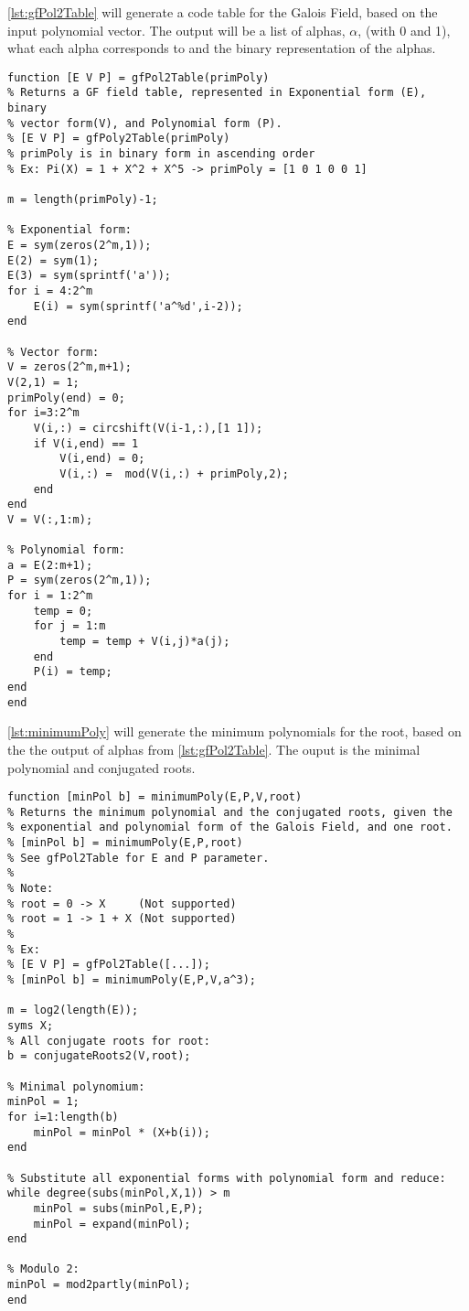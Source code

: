 \documentclass[Main]{subfiles}
\begin{document}
\codeTitle \ref{lst:gfPol2Table} will generate a code table for the Galois Field, based on the input polynomial vector.
The output will be a list of alphas, $\alpha$, (with 0 and 1), what each alpha corresponds to and the binary representation of the alphas.
\begin{lstlisting}[caption=gfPol2Table, style=Code-Matlab, label=lst:gfPol2Table]
function [E V P] = gfPol2Table(primPoly)
% Returns a GF field table, represented in Exponential form (E), binary
% vector form(V), and Polynomial form (P).
% [E V P] = gfPoly2Table(primPoly)
% primPoly is in binary form in ascending order
% Ex: Pi(X) = 1 + X^2 + X^5 -> primPoly = [1 0 1 0 0 1]

m = length(primPoly)-1;

% Exponential form:
E = sym(zeros(2^m,1));
E(2) = sym(1);
E(3) = sym(sprintf('a'));
for i = 4:2^m
    E(i) = sym(sprintf('a^%d',i-2));
end

% Vector form:
V = zeros(2^m,m+1);
V(2,1) = 1;
primPoly(end) = 0;
for i=3:2^m
    V(i,:) = circshift(V(i-1,:),[1 1]);
    if V(i,end) == 1
        V(i,end) = 0;
        V(i,:) =  mod(V(i,:) + primPoly,2);
    end
end
V = V(:,1:m);

% Polynomial form:
a = E(2:m+1);
P = sym(zeros(2^m,1));
for i = 1:2^m
    temp = 0;
    for j = 1:m
        temp = temp + V(i,j)*a(j);
    end
    P(i) = temp;
end
end
\end{lstlisting}



\codeTitle \ref{lst:minimumPoly} will generate the minimum polynomials for the root, based on the the output of alphas from \codeTitle \ref{lst:gfPol2Table}.
The ouput is the minimal polynomial and conjugated roots.

\begin{lstlisting}[caption=MinimumPoly, style=Code-Matlab, label=lst:minimumPoly]
function [minPol b] = minimumPoly(E,P,V,root)
% Returns the minimum polynomial and the conjugated roots, given the
% exponential and polynomial form of the Galois Field, and one root.
% [minPol b] = minimumPoly(E,P,root)
% See gfPol2Table for E and P parameter.
%
% Note: 
% root = 0 -> X     (Not supported)
% root = 1 -> 1 + X (Not supported)
%
% Ex: 
% [E V P] = gfPol2Table([...]);
% [minPol b] = minimumPoly(E,P,V,a^3);

m = log2(length(E));
syms X;
% All conjugate roots for root:
b = conjugateRoots2(V,root);

% Minimal polynomium:
minPol = 1;
for i=1:length(b)
    minPol = minPol * (X+b(i));
end
 
% Substitute all exponential forms with polynomial form and reduce:
while degree(subs(minPol,X,1)) > m
    minPol = subs(minPol,E,P);
    minPol = expand(minPol);
end

% Modulo 2:
minPol = mod2partly(minPol);
end
\end{lstlisting}
\end{document}
